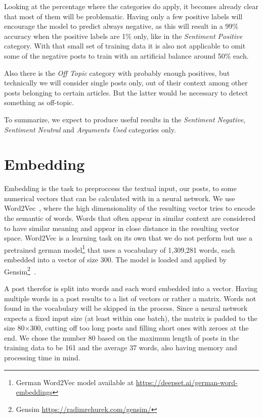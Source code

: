 \documentclass[11pt,a4paper]{article}
\begin{document}
Looking at the percentage where the categories do apply, it becomes already clear that most of them will be problematic. 
Having only a few positive labels will encourage the model to predict always negative, as this will result in a 99\% accuracy when the positive labels are 1\% only, like in the \textit{Sentiment Positive} category. With that small set of training data it is also not applicable to omit some of the negative posts to train with an artificial balance around 50\% each.

Also there is the \textit{Off Topic} category with probably enough positives, but technically we will consider single posts only, out of their context among other posts belonging to certain articles. But the latter would be necessary to detect something as off-topic.

To summarize, we expect to produce useful results in the \textit{Sentiment Negative}, \textit{Sentiment Neutral} and \textit{Arguments Used} categories only.

\section{Embedding}

Embedding is the task to preproccess the textual input, our posts, to some numerical vectors that can be calculated with in a neural network. 
We use Word2Vec~\cite{word2vec}, where the high dimensionality of the resulting vector tries to encode the semantic of words. 
Words that often appear in similar context are considered to have similar meaning and appear in close distance in the resulting vector space.
Word2Vec is a learning task on its own that we do not perform but use a pretrained german model\footnote{German Word2Vec model available at \url{https://deepset.ai/german-word-embeddings}} that uses a vocabulary of 1,309,281 words, each embedded into a vector of size 300.
The model is loaded and applied by Gensim\footnote{Gensim \url{https://radimrehurek.com/gensim/}}~\cite{gensim}.

A post therefor is split into words and each word embedded into a vector. Having multiple words in a post results to a list of vectors or rather a matrix. 
Words not found in the vocabulary will be skipped in the process. 
Since a neural network expects a fixed input size (at least within one batch), the matrix is padded to the size 80$\times$300, cutting off too long posts and filling short ones with zeroes at the end. 
We chose the number 80 based on the maximum length of posts in the training data to be 161 and the average 37 words, also having memory and processing time in mind.
\end{document}
